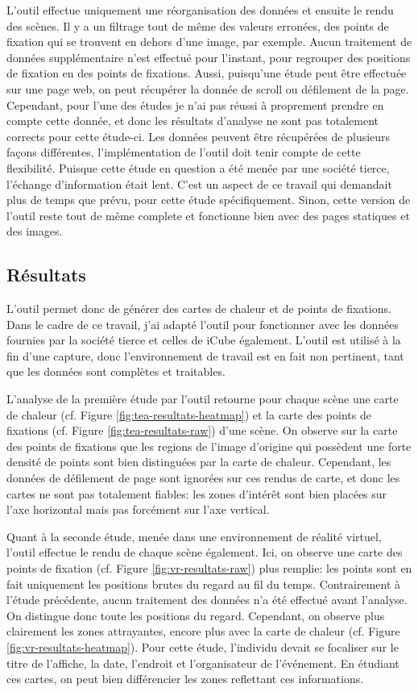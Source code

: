 \documentclass[hidelinks,12pt]{article}
\begin{document}
\bigskip
L'outil effectue uniquement une réorganisation des données et ensuite le rendu
des scènes. Il y a un filtrage tout de même des valeurs erronées, des points de
fixation qui se trouvent en dehors d'une image, par exemple. Aucun traitement
de données supplémentaire n'est effectué pour l'instant, pour regrouper des
positions de fixation en des points de fixations. Aussi, puisqu'une étude peut
être effectuée sur une page web, on peut récupérer la donnée de scroll ou
défilement de la page. Cependant, pour l'une des études je n'ai pas réussi à
proprement prendre en compte cette donnée, et donc les résultats d'analyse ne
sont pas totalement corrects pour cette étude-ci. Les données peuvent être
récupérées de plusieurs façons différentes, l'implémentation de l'outil doit
tenir compte de cette flexibilité. Puisque cette étude en question a été menée
par une société tierce, l'échange d'information était lent. C'est un aspect de
ce travail qui demandait plus de temps que prévu, pour cette étude
spécifiquement. Sinon, cette version de l'outil reste tout de même complete et
fonctionne bien avec des pages statiques et des images.

\subsection{Résultats}

L'outil permet donc de générer des cartes de chaleur et de points de fixations.
Dans le cadre de ce travail, j'ai adapté l'outil pour fonctionner avec les
données fournies par la société tierce et celles de iCube également. L'outil est
utilisé à la fin d'une capture, donc l'environnement de travail est en fait non
pertinent, tant que les données sont complètes et traitables.

\bigskip
L'analyse de la première étude par l'outil retourne pour chaque scène une carte
de chaleur (cf. Figure \ref{fig:tea-resultats-heatmap}) et la carte des points
de fixations (cf. Figure \ref{fig:tea-resultats-raw}) d'une scène. On observe
sur la carte des points de fixations que les regions de l'image d'origine qui
possèdent une forte densité de points sont bien distinguées par la carte de
chaleur. Cependant, les données de défilement de page sont ignorées sur ces
rendus de carte, et donc les cartes ne sont pas totalement fiables: les zones
d'intérêt sont bien placées sur l'axe horizontal mais pas forcément sur l'axe
vertical.

\bigskip
Quant à la seconde étude, menée dans une environnement de réalité virtuel,
l'outil effectue le rendu de chaque scène également. Ici, on observe une carte
des points de fixation (cf. Figure \ref{fig:vr-resultats-raw}) plus remplie:
les  points sont en fait uniquement les positions brutes du regard au fil du
temps. Contrairement à l'étude précédente, aucun traitement des données n'a été
effectué avant l'analyse. On distingue donc toute les positions du regard.
Cependant, on observe plus clairement les zones attrayantes, encore plus avec
la carte de chaleur (cf. Figure \ref{fig:vr-resultats-heatmap}). Pour cette
étude, l'individu devait se focaliser sur le titre de l'affiche, la date,
l'endroit et l'organisateur de l'événement. En étudiant ces cartes, on peut
bien différencier les zones reflettant ces informations.
\end{document}
